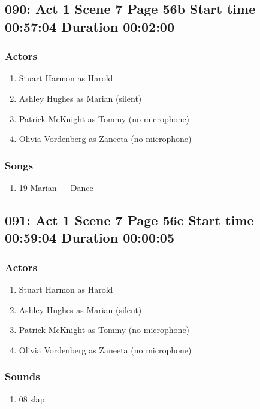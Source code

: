 \subsection{090: Act 1 Scene 7 Page 56b Start time 00:57:04 Duration 00:02:00}

\subsubsection{Actors}
\begin{enumerate}
\item Stuart Harmon as Harold
\item Ashley Hughes as Marian (silent)
\item Patrick McKnight as Tommy (no microphone)
\item Olivia Vordenberg as Zaneeta (no microphone)
\end{enumerate}

\subsubsection{Songs}
\begin{enumerate}
\item 19 Marian --- Dance
\end{enumerate}
\subsection{091: Act 1 Scene 7 Page 56c Start time 00:59:04 Duration 00:00:05}

\subsubsection{Actors}
\begin{enumerate}
\item Stuart Harmon as Harold
\item Ashley Hughes as Marian (silent)
\item Patrick McKnight as Tommy (no microphone)
\item Olivia Vordenberg as Zaneeta (no microphone)
\end{enumerate}

\subsubsection{Sounds}
\begin{enumerate}
\item 08 slap
\end{enumerate}
